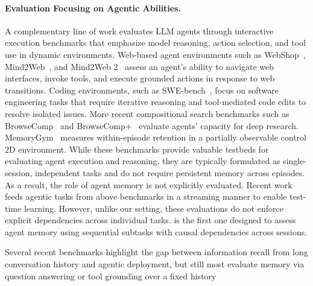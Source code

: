 \paragraph{Evaluation Focusing on Agentic Abilities.}
A complementary line of work evaluates LLM agents through interactive execution benchmarks that emphasize model reasoning, action selection, and tool use in dynamic environments. Web-based agent environments such as WebShop~\citep{yao2022webshop},  Mind2Web~\citep{deng2023mind2web}, and Mind2Web 2~\citep{gou2025mind2web} assess an agent’s ability to navigate web interfaces, invoke tools, and execute grounded actions in response to web transitions. Coding environments, such as SWE-bench~\citep{jimenez2023swe}, focus on software engineering tasks that require iterative reasoning and tool-mediated code edits to resolve isolated issues. More recent compositional search benchmarks such as BrowseComp~\citep{wei2025browsecomp} and BrowseComp+~\citep{chen2025browsecomp} evaluate agents’ capacity for deep research. MemoryGym~\citep{pleines2025memory} measures within-episode retention in a partially observable control 2D environment. While these benchmarks provide valuable testbeds for evaluating agent execution and reasoning, they are typically formulated as single-session, independent tasks and do not require persistent memory across episodes. As a result, the role of agent memory is not explicitly evaluated. Recent work \citep{zhong2024memorybank, wei2025evo} feeds agentic tasks from above benchmarks in a streaming manner to enable test-time learning. However, unlike our setting, these evaluations do not enforce explicit dependencies across individual tasks. \ours is the first one designed to assess agent memory using sequential subtasks with causal dependencies across sessions. 

Several recent benchmarks highlight the gap between information recall from long conversation history and agentic deployment, but still most evaluate memory via question answering or tool grounding over a fixed history

